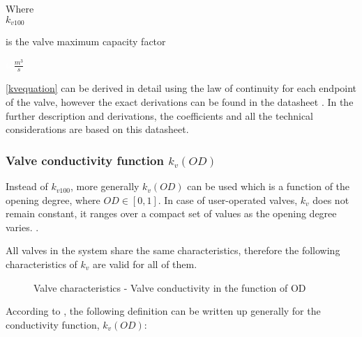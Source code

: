 \begin{minipage}[t]{0.20\textwidth}
Where\\
\hspace*{8mm} $k_{v100}$ 
\end{minipage}
\begin{minipage}[t]{0.68\textwidth}
\vspace*{2mm}
is the valve maximum capacity factor  
 \end{minipage}
\begin{minipage}[t]{0.10\textwidth}
\vspace*{2mm}
\textcolor{White}{te}$\unit{\frac{m^{3}}{s}}$
\end{minipage}

\eqref{kvequation} can be derived in detail using the law of continuity for each endpoint of the valve, however the exact derivations can be found in the datasheet \cite{kvvalve}. In the further description and derivations, the coefficients and all the technical considerations are based on this datasheet.  

\subsubsection{Valve conductivity function \texorpdfstring{$k_v(OD)$}{}}
\label{OD}

Instead of $k_{v100}$, more generally $k_v(OD)$ can be used which is a function of the opening degree, where $OD \in  [0,1]$. In case of user-operated valves, $k_{v}$ does not remain constant, it ranges over a compact set of values as the opening degree varies. \cite{Kallesoe2009}.

All valves in the system share the same characteristics, therefore the following characteristics of $k_{v}$ are valid for all of them. 


\begin{figure}[H]
\centering
 
\caption{Valve characteristics - Valve conductivity in the function of OD}
\label{valve_conductivity}
\end{figure}

According to \cite{keller}, the following definition can be written up generally for the conductivity function, $k_v(OD)$:


